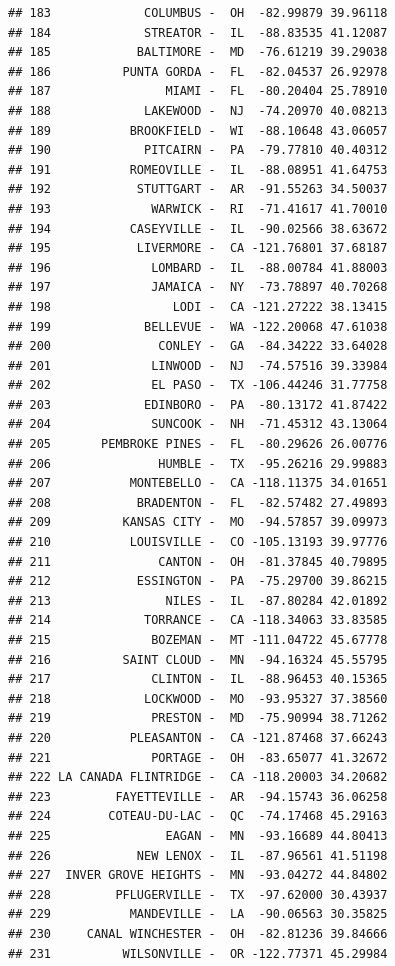\documentclass{article}\usepackage[]{graphicx}\usepackage[]{color}
\makeatletter
\newenvironment{kframe}{%
 \def\at@end@of@kframe{}%
 \ifinner\ifhmode%
  \def\at@end@of@kframe{\end{minipage}}%
  \begin{minipage}{\columnwidth}%
 \fi\fi%
 \def\FrameCommand##1{\hskip\@totalleftmargin \hskip-\fboxsep
 \colorbox{shadecolor}{##1}\hskip-\fboxsep
     \hskip-\linewidth \hskip-\@totalleftmargin \hskip\columnwidth}%
 \MakeFramed {\advance\hsize-\width
   \@totalleftmargin\z@ \linewidth\hsize
   \@setminipage}}%
 {\par\unskip\endMakeFramed%
 \at@end@of@kframe}
\newenvironment{knitrout}{}{} %
\makeatother
\begin{document}
\begin{knitrout}
\begin{kframe}
\begin{verbatim}
## 183             COLUMBUS -  OH  -82.99879 39.96118
## 184             STREATOR -  IL  -88.83535 41.12087
## 185            BALTIMORE -  MD  -76.61219 39.29038
## 186          PUNTA GORDA -  FL  -82.04537 26.92978
## 187                MIAMI -  FL  -80.20404 25.78910
## 188             LAKEWOOD -  NJ  -74.20970 40.08213
## 189           BROOKFIELD -  WI  -88.10648 43.06057
## 190             PITCAIRN -  PA  -79.77810 40.40312
## 191           ROMEOVILLE -  IL  -88.08951 41.64753
## 192            STUTTGART -  AR  -91.55263 34.50037
## 193              WARWICK -  RI  -71.41617 41.70010
## 194           CASEYVILLE -  IL  -90.02566 38.63672
## 195            LIVERMORE -  CA -121.76801 37.68187
## 196              LOMBARD -  IL  -88.00784 41.88003
## 197              JAMAICA -  NY  -73.78897 40.70268
## 198                 LODI -  CA -121.27222 38.13415
## 199             BELLEVUE -  WA -122.20068 47.61038
## 200               CONLEY -  GA  -84.34222 33.64028
## 201              LINWOOD -  NJ  -74.57516 39.33984
## 202              EL PASO -  TX -106.44246 31.77758
## 203             EDINBORO -  PA  -80.13172 41.87422
## 204              SUNCOOK -  NH  -71.45312 43.13064
## 205       PEMBROKE PINES -  FL  -80.29626 26.00776
## 206               HUMBLE -  TX  -95.26216 29.99883
## 207           MONTEBELLO -  CA -118.11375 34.01651
## 208            BRADENTON -  FL  -82.57482 27.49893
## 209          KANSAS CITY -  MO  -94.57857 39.09973
## 210           LOUISVILLE -  CO -105.13193 39.97776
## 211               CANTON -  OH  -81.37845 40.79895
## 212            ESSINGTON -  PA  -75.29700 39.86215
## 213                NILES -  IL  -87.80284 42.01892
## 214             TORRANCE -  CA -118.34063 33.83585
## 215              BOZEMAN -  MT -111.04722 45.67778
## 216          SAINT CLOUD -  MN  -94.16324 45.55795
## 217              CLINTON -  IL  -88.96453 40.15365
## 218             LOCKWOOD -  MO  -93.95327 37.38560
## 219              PRESTON -  MD  -75.90994 38.71262
## 220           PLEASANTON -  CA -121.87468 37.66243
## 221              PORTAGE -  OH  -83.65077 41.32672
## 222 LA CANADA FLINTRIDGE -  CA -118.20003 34.20682
## 223         FAYETTEVILLE -  AR  -94.15743 36.06258
## 224        COTEAU-DU-LAC -  QC  -74.17468 45.29163
## 225                EAGAN -  MN  -93.16689 44.80413
## 226            NEW LENOX -  IL  -87.96561 41.51198
## 227  INVER GROVE HEIGHTS -  MN  -93.04272 44.84802
## 228         PFLUGERVILLE -  TX  -97.62000 30.43937
## 229           MANDEVILLE -  LA  -90.06563 30.35825
## 230     CANAL WINCHESTER -  OH  -82.81236 39.84666
## 231          WILSONVILLE -  OR -122.77371 45.29984

\end{verbatim}
\end{kframe}
\end{knitrout}
\end{document}
